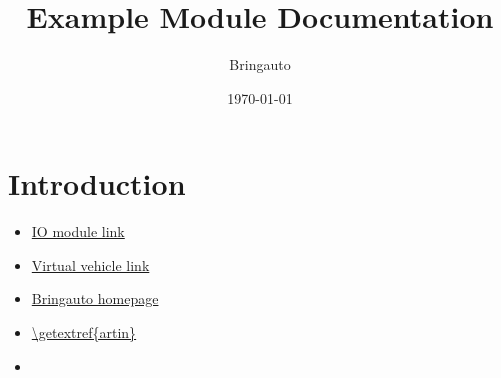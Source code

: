 \documentclass{article}
\title{Example Module Documentation}
\author{Bringauto}
\date{\today}
\begin{document}
\maketitle %

\section{Introduction}

\begin{itemize}
    \item \href{\getref{io_module}}{IO module link}
    \item \href{\getref{virtual_vehicle}}{Virtual vehicle link}
    \item \href{\getextref{bringauto}}{Bringauto homepage}
    \item \url{\getextref{artin}}
    \item {}
\end{itemize}
\end{document}
